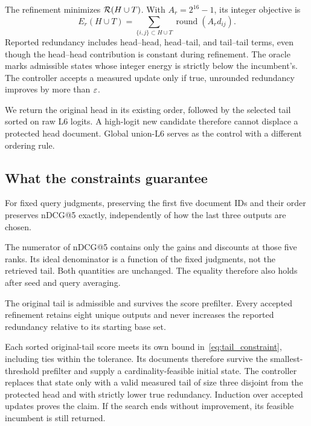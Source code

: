 The refinement minimizes $\mathcal{R}(H\cup T)$. With $A_r=2^{16}-1$, its integer objective is
\begin{equation}
E_r(H\cup T)=\sum_{\{i,j\}\subset H\cup T}\operatorname{round}(A_r d_{ij}).
\label{eq:refinement_energy}
\end{equation}
Reported redundancy includes head--head, head--tail, and tail--tail terms, even though the head--head contribution is constant during refinement. The oracle marks admissible states whose integer energy is strictly below the incumbent's. The controller accepts a measured update only if true, unrounded redundancy improves by more than $\varepsilon$.

We return the original head in its existing order, followed by the selected tail sorted on raw L6 logits. A high-logit new candidate therefore cannot displace a protected head document. Global union-L6 serves as the control with a different ordering rule.

\subsection{What the constraints guarantee}
\begin{proposition}\label{prop:prefix}
For fixed query judgments, preserving the first five document IDs and their order preserves nDCG@5 exactly, independently of how the last three outputs are chosen.
\end{proposition}
\begin{IEEEproof}
The numerator of nDCG@5 contains only the gains and discounts at those five ranks. Its ideal denominator is a function of the fixed judgments, not the retrieved tail. Both quantities are unchanged. The equality therefore also holds after seed and query averaging.
\end{IEEEproof}

\begin{proposition}\label{prop:safety}
The original tail is admissible and survives the score prefilter. Every accepted refinement retains eight unique outputs and never increases the reported redundancy relative to its starting base set.
\end{proposition}
\begin{IEEEproof}
Each sorted original-tail score meets its own bound in~\eqref{eq:tail_constraint}, including ties within the tolerance. Its documents therefore survive the smallest-threshold prefilter and supply a cardinality-feasible initial state. The controller replaces that state only with a valid measured tail of size three disjoint from the protected head and with strictly lower true redundancy. Induction over accepted updates proves the claim. If the search ends without improvement, its feasible incumbent is still returned.
\end{IEEEproof}

